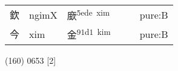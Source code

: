 \documentclass[14pt,a4paper]{scrartcl}
\begin{document}
\begin{longtable}[c]{@{}llllll@{}}
\begin{minipage}[t]{0.14\columnwidth}
欽
\strut\end{minipage} &
\begin{minipage}[t]{0.14\columnwidth}\raggedright\strut
ngimX
\strut\end{minipage} &
\begin{minipage}[t]{0.14\columnwidth}\raggedright\strut
廞\textsuperscript{5ede~xim}
\strut\end{minipage} &
\begin{minipage}[t]{0.14\columnwidth}\raggedright\strut
\strut\end{minipage} &
\begin{minipage}[t]{0.14\columnwidth}\raggedright\strut
\strut\end{minipage} &
\begin{minipage}[t]{0.14\columnwidth}\raggedright\strut
pure:B
\strut\end{minipage}\tabularnewline
\begin{minipage}[t]{0.14\columnwidth}\raggedright\strut
今
\strut\end{minipage} &
\begin{minipage}[t]{0.14\columnwidth}\raggedright\strut
xim
\strut\end{minipage} &
\begin{minipage}[t]{0.14\columnwidth}\raggedright\strut
金\textsuperscript{91d1~kim}
\strut\end{minipage} &
\begin{minipage}[t]{0.14\columnwidth}\raggedright\strut
\strut\end{minipage} &
\begin{minipage}[t]{0.14\columnwidth}\raggedright\strut
\strut\end{minipage} &
\begin{minipage}[t]{0.14\columnwidth}\raggedright\strut
pure:B
\strut\end{minipage}\tabularnewline
\bottomrule
\end{longtable}

(160) 0653 {[}2{]}
\end{document}
